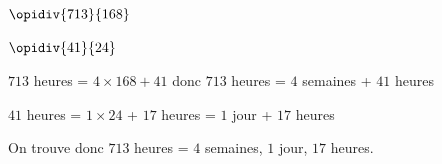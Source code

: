 \begin{pageCours}
\begin{Mt}
\begin{minipage}{0.4\linewidth}
$\opidiv{713}{168}$
\end{minipage}
\begin{minipage}{0.4\linewidth}
$\opidiv{41}{24}$
\end{minipage}

$713$ heures  = $4 \times 168 + 41$ donc  $713$ heures  = $4$ semaines + $41$ heures

$41$ heures = $1 \times 24$ + $17$  heures = $1$ jour  + $17$ heures

On trouve donc $713$  heures = $4$ semaines, $1$ jour, $17$ heures.
\end{Mt}



\end{pageCours}

